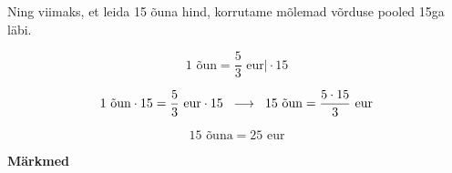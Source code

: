 \begin{center}
{{{\begin{flushleft}
\hspace{5mm} Ning viimaks, et leida 15 õuna hind, korrutame mõlemad võrduse pooled 15ga läbi.

\begin{equation}
1\text{ õun} = \dfrac{ 5 }{3}\text{ eur} \bigg| \cdot 15 
\end{equation}

\begin{equation}
1 \text{ õun}\cdot 15 = \dfrac{ 5 }{3}\text{ eur} \cdot 15 \hspace{2mm} \longrightarrow \hspace{2mm} 15 \text{ õun} = \dfrac{ 5 \cdot 15 }{3}\text{ eur}
\end{equation}


\begin{equation}
15 \text{ õuna} = 25 \text{ eur}
\end{equation}

\end{flushleft}
}}}
\end{center}

\vspace{1cm}

\textbf{Märkmed}\\
\vspace{2mm}
\begin{mdframed}[style=graphpaper]
\vspace{7cm}
\end{mdframed}